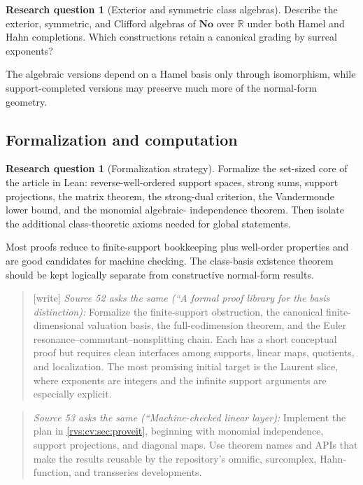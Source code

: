 \documentclass[11pt,letterpaper]{article}
\numberwithin{equation}{section}
\theoremstyle{definition}
\newtheorem{question}[theorem]{Research question}
\theoremstyle{remark}
\newcommand{\No}{\mathbf{No}}
\newcommand{\R}{\mathbb{R}}
\newcommand{\wtag}{\textup{[write]}}%
\begin{document}
\begin{question}[Exterior and symmetric class algebras]
Describe the exterior, symmetric, and Clifford algebras of \(\No\) over
\(\R\) under both Hamel and Hahn completions.  Which constructions retain a
canonical grading by surreal exponents?
\end{question}

The algebraic versions depend on a Hamel basis only through isomorphism, while
support-completed versions may preserve much more of the normal-form geometry.

\subsection{Formalization and computation}

\begin{question}[Formalization strategy]
Formalize the set-sized core of the article in Lean: reverse-well-ordered
support spaces, strong sums, support projections, the matrix theorem, the
strong-dual criterion, the Vandermonde lower bound, and the monomial algebraic-
independence theorem.  Then isolate the additional class-theoretic axioms
needed for global statements.
\end{question}

Most proofs reduce to finite-support bookkeeping plus well-order properties
and are good candidates for machine checking.  The class-basis existence
theorem should be kept logically separate from constructive normal-form
results.
\begin{quote}\small
\wtag{} \emph{Source 52 asks the same (``A formal proof library for the basis distinction):}
Formalize the finite-support obstruction, the canonical finite-dimensional valuation basis, the full-codimension theorem, and the Euler resonance--commutant--nonsplitting chain. Each has a short conceptual proof but requires clean interfaces among supports, linear maps, quotients, and localization. The most promising initial target is the Laurent slice, where exponents are integers and the infinite support arguments are especially explicit.
\end{quote}

\begin{quote}\small
\emph{Source 53 asks the same (``Machine-checked linear layer):}
Implement the plan in \cref{rvs:cv:sec:proveit}, beginning with monomial independence,
support projections, and diagonal maps. Use theorem names and APIs that make the
results reusable by the repository's omnific, surcomplex, Hahn-function, and
transseries developments.
\end{quote}
\end{document}
